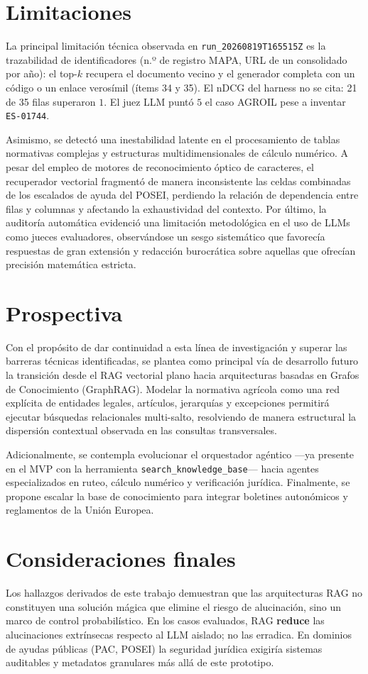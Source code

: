 \section{Limitaciones}
La principal limitación técnica observada en \texttt{run\_20260819T165515Z} es la trazabilidad de identificadores (n.º de registro MAPA, URL de un consolidado por año): el top-$k$ recupera el documento vecino y el generador completa con un código o un enlace verosímil (ítems 34 y 35). El nDCG del harness no se cita: 21 de 35 filas superaron $1$. El juez LLM puntó $5$ el caso AGROIL pese a inventar \texttt{ES-01744}.

Asimismo, se detectó una inestabilidad latente en el procesamiento de tablas normativas complejas y estructuras multidimensionales de cálculo numérico. A pesar del empleo de motores de reconocimiento óptico de caracteres, el recuperador vectorial fragmentó de manera inconsistente las celdas combinadas de los escalados de ayuda del POSEI, perdiendo la relación de dependencia entre filas y columnas y afectando la exhaustividad del contexto. Por último, la auditoría automática evidenció una limitación metodológica en el uso de LLMs como jueces evaluadores, observándose un sesgo sistemático que favorecía respuestas de gran extensión y redacción burocrática sobre aquellas que ofrecían precisión matemática estricta.

\section{Prospectiva}
Con el propósito de dar continuidad a esta línea de investigación y superar las barreras técnicas identificadas, se plantea como principal vía de desarrollo futuro la transición desde el RAG vectorial plano hacia arquitecturas basadas en Grafos de Conocimiento (GraphRAG). Modelar la normativa agrícola como una red explícita de entidades legales, artículos, jerarquías y excepciones permitirá ejecutar búsquedas relacionales multi-salto, resolviendo de manera estructural la dispersión contextual observada en las consultas transversales.

Adicionalmente, se contempla evolucionar el orquestador agéntico ---ya presente en el MVP con la herramienta \texttt{search\_knowledge\_base}--- hacia agentes especializados en ruteo, cálculo numérico y verificación jurídica. Finalmente, se propone escalar la base de conocimiento para integrar boletines autonómicos y reglamentos de la Unión Europea.

\section{Consideraciones finales}
Los hallazgos derivados de este trabajo demuestran que las arquitecturas RAG no constituyen una solución mágica que elimine el riesgo de alucinación, sino un marco de control probabilístico. En los casos evaluados, RAG \textbf{reduce} las alucinaciones extrínsecas respecto al LLM aislado; no las erradica. En dominios de ayudas públicas (PAC, POSEI) la seguridad jurídica exigiría sistemas auditables y metadatos granulares más allá de este prototipo.

